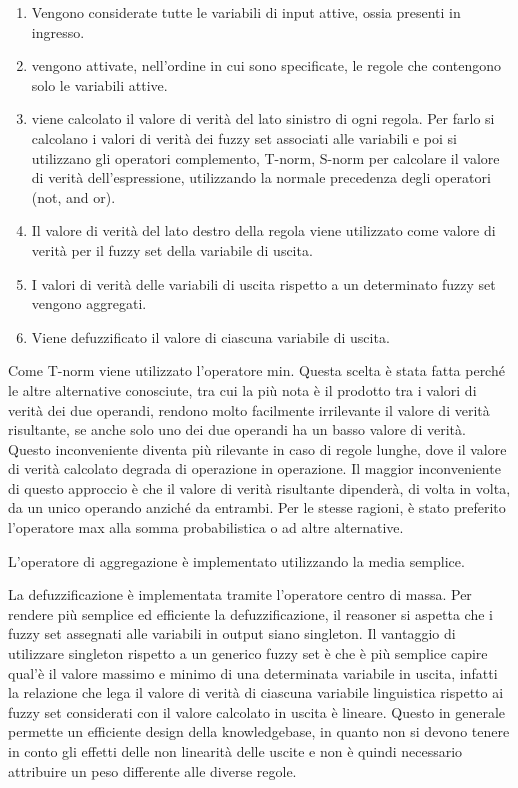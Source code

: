 \begin{enumerate}
 \item Vengono considerate tutte le variabili di input attive, ossia presenti in ingresso.
 \item vengono attivate, nell'ordine in cui sono specificate, le regole che contengono solo le variabili attive.
 \item viene calcolato il valore di verità del lato sinistro di ogni regola. Per farlo si calcolano i valori di verità dei fuzzy set associati alle variabili e poi si utilizzano gli operatori complemento, T-norm, S-norm per calcolare il valore di verità dell'espressione, utilizzando la normale precedenza degli operatori (not, and or).
 \item Il valore di verità del lato destro della regola viene utilizzato come valore di verità per il fuzzy set della variabile di uscita.
 \item I valori di verità delle variabili di uscita rispetto a un determinato fuzzy set vengono aggregati.
 \item Viene defuzzificato il valore di ciascuna variabile di uscita. 
\end{enumerate}

Come T-norm viene utilizzato l'operatore min. Questa scelta è stata fatta perché le altre alternative conosciute, tra cui la più nota è il prodotto tra i valori di verità dei due operandi, rendono molto facilmente irrilevante il valore di verità risultante, se anche solo uno dei due operandi ha un basso valore di verità. Questo inconveniente diventa più rilevante in caso di regole lunghe, dove il valore di verità calcolato degrada di operazione in operazione. Il maggior inconveniente di questo approccio è che il valore di verità risultante dipenderà, di volta in volta, da un unico operando anziché da entrambi.
Per le stesse ragioni, è stato preferito l'operatore max alla somma probabilistica o ad altre alternative.

L'operatore di aggregazione è implementato utilizzando la media semplice.

La defuzzificazione è implementata tramite l'operatore centro di massa. Per rendere più semplice ed efficiente la defuzzificazione, il reasoner si aspetta che i fuzzy set assegnati alle variabili in output siano singleton. Il vantaggio di utilizzare singleton rispetto a un generico fuzzy set è che è più semplice capire qual'è il valore massimo e minimo di una determinata variabile in uscita, infatti la relazione che lega il valore di verità di ciascuna variabile linguistica rispetto ai fuzzy set considerati con il valore calcolato in uscita è lineare. Questo in generale permette un efficiente design della knowledgebase, in quanto non si devono tenere in conto gli effetti delle non linearità delle uscite e non è quindi necessario attribuire un peso differente alle diverse regole.

